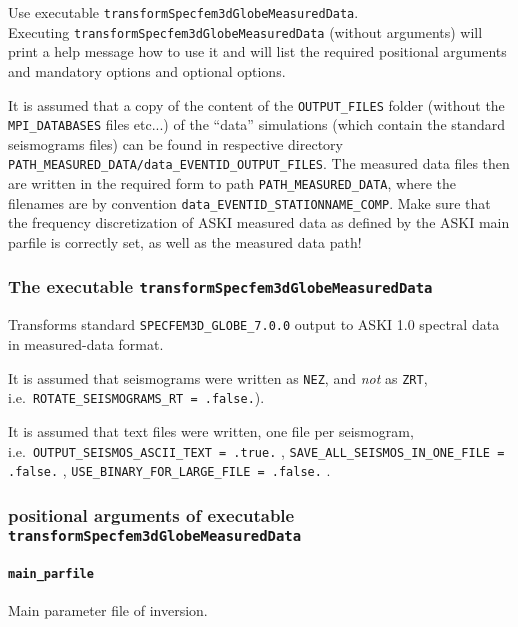 \documentclass[12pt,a4paper]{article}
\newcommand{\lcode}[1]{\nolinkurl{#1}}
\newcommand{\ASKI}{ {\ttfamily ASKI} }
\begin{document}
Use executable \lcode{transformSpecfem3dGlobeMeasuredData}. \\
Executing \lcode{transformSpecfem3dGlobeMeasuredData} (without arguments) 
will print a help message how to use it and will list the required positional 
arguments and mandatory options and optional options.

It is assumed that a copy of the content of the \lcode{OUTPUT_FILES} folder 
(without the \lcode{MPI_DATABASES} files etc...)
of the ``data'' simulations (which contain the standard seismograms files) can be found in respective
directory \lcode{PATH_MEASURED_DATA/data_EVENTID_OUTPUT_FILES}. 
The measured data files then are written in the required form to path \lcode{PATH_MEASURED_DATA}, where the filenames are by
convention \lcode{data_EVENTID_STATIONNAME_COMP}. 
Make sure that the frequency discretization of \ASKI measured data as defined by the \ASKI main parfile 
is correctly set, as well as the measured data path!

\subsubsection*{The executable \lcode{transformSpecfem3dGlobeMeasuredData}}
Transforms standard \lcode{SPECFEM3D_GLOBE_7.0.0} output to \ASKI 1.0 spectral data in measured-data 
format.

It is assumed that seismograms were written as \lcode{NEZ}, and \emph{not} as \lcode{ZRT},
i.e.\ \lcode{ROTATE_SEISMOGRAMS_RT = .false.}). 

It is assumed that text files were written, one file per seismogram, 
i.e.\ \lcode{OUTPUT_SEISMOS_ASCII_TEXT = .true.} , \lcode{SAVE_ALL_SEISMOS_IN_ONE_FILE = .false.} , 
\lcode{USE_BINARY_FOR_LARGE_FILE = .false.} .

\subsubsection*{positional arguments of executable \lcode{transformSpecfem3dGlobeMeasuredData}}
\paragraph{\lcode{main_parfile}}
Main parameter file of inversion.
\end{document}
